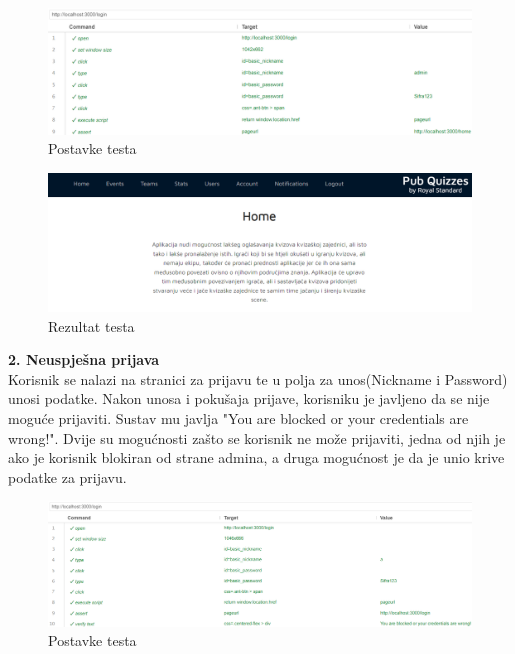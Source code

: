 				\begin{figure}[H]
					\includegraphics[width=\textwidth]{slike/UspjesnaPrijava1.PNG} 
					\caption{Postavke testa}
					\label{fig:UspjesnaPrijava1}
				\end{figure}

				\begin{figure}[H]
					\includegraphics[width=\textwidth]{slike/UspjesnaPrijava2.PNG} 
					\caption{Rezultat testa}
					\label{fig:UspjesnaPrijava1}
				\end{figure}
				
			\eject

			\textbf{2. Neuspješna prijava}\\
				
				Korisnik se nalazi na stranici za prijavu te u polja za unos(Nickname i Password) unosi podatke. Nakon unosa i pokušaja prijave, korisniku je javljeno da se nije moguće prijaviti. Sustav mu javlja "You are blocked or your credentials are wrong!". Dvije su mogućnosti zašto se korisnik ne može prijaviti, jedna od njih je ako je korisnik blokiran od strane admina, a druga mogućnost je da je unio krive podatke za prijavu.

				\begin{figure}[H]
					\includegraphics[width=\textwidth]{slike/NeuspjesnaPrijava1.PNG} 
					\caption{Postavke testa}
					\label{fig:NeuspjesnaPrijava1}
				\end{figure}


